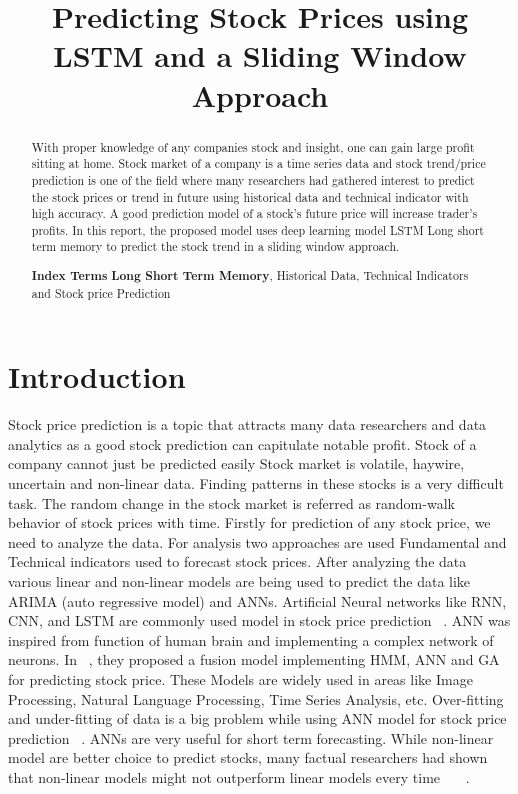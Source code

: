 \documentclass[5p,,preprint,12pt,twocolumn]{elsarticle}
\begin{document}
\begin{frontmatter}
	
\title{Predicting Stock Prices using LSTM and a Sliding Window Approach
}
    
    

\begin{abstract}
 With proper knowledge of any companies stock and insight, one can gain large profit sitting at home. Stock market of a company is a time series data and stock trend/price prediction is one of the field where many researchers had gathered interest to predict the stock prices or trend in future using historical data and technical indicator with high accuracy. A good prediction model of a stock's future price will increase trader's profits. In this report, the proposed model uses deep learning model LSTM {\textemdash} Long short term memory to predict the stock trend in a sliding window approach. 

\textbf{Index Terms}{\textendash} \textbf{Long Short Term Memory}, Historical Data, Technical Indicators and Stock price Prediction
\end{abstract}
\end{frontmatter}
    
\section{Introduction}
 Stock price prediction is a topic that attracts many data researchers and data analytics as a good stock prediction can capitulate notable profit. Stock of a company cannot just be predicted easily Stock market is volatile, haywire, uncertain and non-linear data. Finding patterns in these stocks is a very difficult task. The random change in the stock market is referred as random-walk behavior of stock prices with time. Firstly for prediction of any stock price, we need to analyze the data. For analysis two approaches are used Fundamental and Technical indicators used to forecast stock prices. After analyzing the data various linear and non-linear models are being used to predict the data like ARIMA (auto regressive model) and ANNs. Artificial Neural networks like RNN, CNN, and LSTM are commonly used model in stock price prediction \unskip~\cite{485690:10916371}. ANN was inspired from function of human brain and implementing a complex network of neurons. In \unskip~\cite{485690:10916372}, they proposed a fusion model implementing HMM, ANN and GA for predicting stock price. These Models are widely used in areas like Image Processing, Natural Language Processing, Time Series Analysis, etc. Over-fitting and under-fitting of data is a big problem while using ANN model for stock price prediction \unskip~\cite{485690:10916375}. ANNs are very useful for short term forecasting. While non-linear model are better choice to predict stocks, many factual researchers had shown that non-linear models might not outperform linear models every time \unskip~\cite{485690:10916374}\unskip~\cite{485690:10916376}\unskip~\cite{485690:10916377}.
\end{document}
